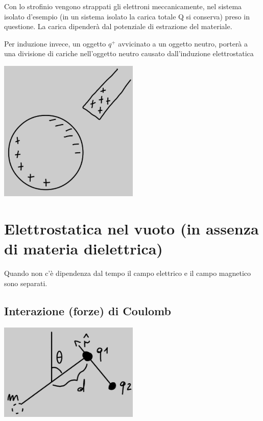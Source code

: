 \documentclass[a4paper, 12pt]{book}
\theoremstyle{plain}
\begin{document}
 Con lo strofinio vengono strappati gli elettroni meccanicamente, nel sistema isolato d'esempio
 (in un sistema isolato la carica totale Q si conserva) preso in questione. La carica dipenderà 
 dal potenziale di estrazione del materiale.

 Per induzione invece, un oggetto \begin{math}
     q^+
 \end{math} avvicinato a un oggetto neutro, porterà a una divisione di cariche nell'oggetto neutro 
 causato dall'induzione elettrostatica
 \begin{center}
     \includegraphics[width=0.5\textwidth]{induzione_elettrostatica.jpg}
 \end{center}

 \chapter{Elettrostatica nel vuoto (in assenza di materia dielettrica)}

Quando non c'è dipendenza dal tempo il campo elettrico e il campo magnetico sono separati.

\section{Interazione (forze) di Coulomb}

\begin{center}
    \includegraphics[width=0.5\textwidth]{coulomb.jpg}
\end{center}
\end{document}
